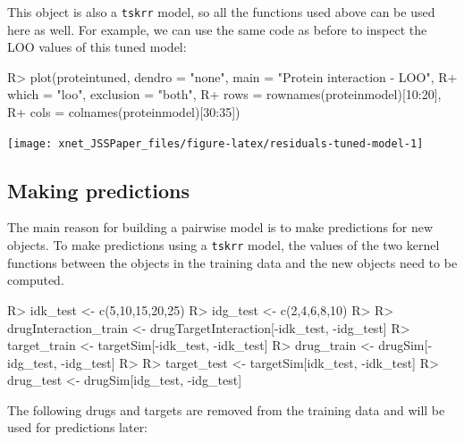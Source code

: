 \documentclass[
]{article}
\begin{document}
This object is also a \texttt{tskrr} model, so all the functions used
above can be used here as well. For example, we can use the same code as
before to inspect the LOO values of this tuned model:

\begin{CodeChunk}

\begin{CodeInput}
R> plot(proteintuned, dendro = "none", main = "Protein interaction - LOO",
R+      which = "loo", exclusion = "both",
R+      rows = rownames(proteinmodel)[10:20],
R+      cols = colnames(proteinmodel)[30:35])
\end{CodeInput}


\begin{center}\texttt{[image: xnet\_JSSPaper\_files/figure-latex/residuals-tuned-model-1]} \end{center}

\end{CodeChunk}

\hypertarget{making-predictions}{%
\subsection{Making predictions}\label{making-predictions}}

The main reason for building a pairwise model is to make predictions for
new objects. To make predictions using a \texttt{tskrr} model, the
values of the two kernel functions between the objects in the training
data and the new objects need to be computed.

\begin{CodeChunk}

\begin{CodeInput}
R> idk_test <- c(5,10,15,20,25)
R> idg_test <- c(2,4,6,8,10)
R> 
R> drugInteraction_train <- drugTargetInteraction[-idk_test, -idg_test]
R> target_train <- targetSim[-idk_test, -idk_test]
R> drug_train <- drugSim[-idg_test, -idg_test]
R> 
R> target_test <- targetSim[idk_test, -idk_test]
R> drug_test <- drugSim[idg_test, -idg_test]
\end{CodeInput}
\end{CodeChunk}

The following drugs and targets are removed from the training data and
will be used for predictions later:
\end{document}
